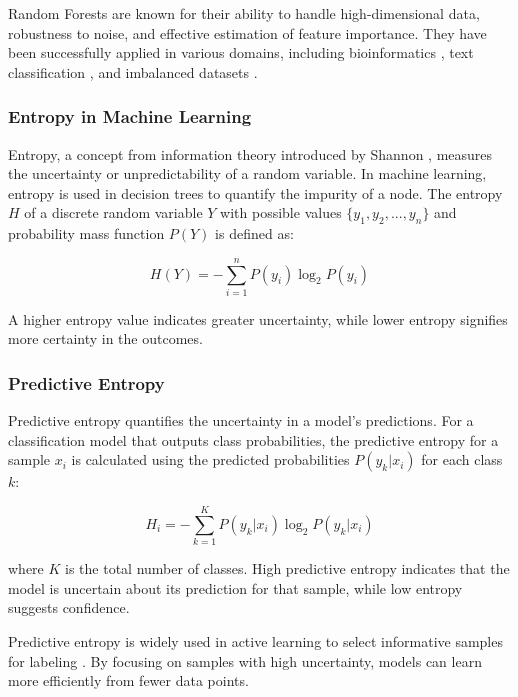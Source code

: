 \documentclass{article}
\begin{document}
Random Forests are known for their ability to handle high-dimensional data, robustness to noise, and effective estimation of feature importance. They have been successfully applied in various domains, including bioinformatics \cite{diaz2006gene}, text classification \cite{liu2011effective}, and imbalanced datasets \cite{homjandee2021random}.

\subsubsection{Entropy in Machine Learning}

Entropy, a concept from information theory introduced by Shannon \cite{shannon1948mathematical}, measures the uncertainty or unpredictability of a random variable. In machine learning, entropy is used in decision trees to quantify the impurity of a node. The entropy $H$ of a discrete random variable $Y$ with possible values $\{y_1, y_2, ..., y_n\}$ and probability mass function $P(Y)$ is defined as:

\begin{equation}
H(Y) = -\sum_{i=1}^{n} P(y_i) \log_2 P(y_i)
\end{equation}

A higher entropy value indicates greater uncertainty, while lower entropy signifies more certainty in the outcomes.

\subsubsection{Predictive Entropy}

Predictive entropy quantifies the uncertainty in a model's predictions. For a classification model that outputs class probabilities, the predictive entropy for a sample $x_i$ is calculated using the predicted probabilities $P(y_k|x_i)$ for each class $k$:

\begin{equation}
H_i = -\sum_{k=1}^{K} P(y_k|x_i) \log_2 P(y_k|x_i)
\end{equation}

where $K$ is the total number of classes. High predictive entropy indicates that the model is uncertain about its prediction for that sample, while low entropy suggests confidence.

Predictive entropy is widely used in active learning to select informative samples for labeling \cite{settles2009active}. By focusing on samples with high uncertainty, models can learn more efficiently from fewer data points.
\end{document}
